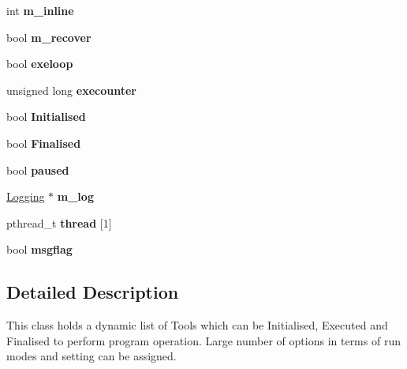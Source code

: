 \begin{DoxyCompactItemize}
\item 
\hypertarget{classToolChain_a9fc8417d6708585de3d4b96a49709a3c}{int {\bfseries m\-\_\-inline}}\label{classToolChain_a9fc8417d6708585de3d4b96a49709a3c}

\item 
\hypertarget{classToolChain_ace512f7eff07742d545cd9c15cf2b3c0}{bool {\bfseries m\-\_\-recover}}\label{classToolChain_ace512f7eff07742d545cd9c15cf2b3c0}

\item 
\hypertarget{classToolChain_a408cf3ba3c040374fa00ac4b789712cd}{bool {\bfseries exeloop}}\label{classToolChain_a408cf3ba3c040374fa00ac4b789712cd}

\item 
\hypertarget{classToolChain_a97ae31bc6524d2dcec465eadbde52bb1}{unsigned long {\bfseries execounter}}\label{classToolChain_a97ae31bc6524d2dcec465eadbde52bb1}

\item 
\hypertarget{classToolChain_a183dede9901ee79ed7c52b41f7d4b3b4}{bool {\bfseries Initialised}}\label{classToolChain_a183dede9901ee79ed7c52b41f7d4b3b4}

\item 
\hypertarget{classToolChain_ac52f9abf9a9df10846ad77ecd48b3065}{bool {\bfseries Finalised}}\label{classToolChain_ac52f9abf9a9df10846ad77ecd48b3065}

\item 
\hypertarget{classToolChain_a047c9aa0130323fd4fa7a0065e18e1f2}{bool {\bfseries paused}}\label{classToolChain_a047c9aa0130323fd4fa7a0065e18e1f2}

\item 
\hypertarget{classToolChain_ae6b3ce2003563d033eeb2f3700d150fa}{\hyperlink{classLogging}{Logging} $\ast$ {\bfseries m\-\_\-log}}\label{classToolChain_ae6b3ce2003563d033eeb2f3700d150fa}

\item 
\hypertarget{classToolChain_af64ffec771bdd358c30daec4148cd9b5}{pthread\-\_\-t {\bfseries thread} \mbox{[}1\mbox{]}}\label{classToolChain_af64ffec771bdd358c30daec4148cd9b5}

\item 
\hypertarget{classToolChain_a621ee785109fba1cb9def121a2ada524}{bool {\bfseries msgflag}}\label{classToolChain_a621ee785109fba1cb9def121a2ada524}

\end{DoxyCompactItemize}


\subsection{Detailed Description}
This class holds a dynamic list of Tools which can be Initialised, Executed and Finalised to perform program operation. Large number of options in terms of run modes and setting can be assigned.

